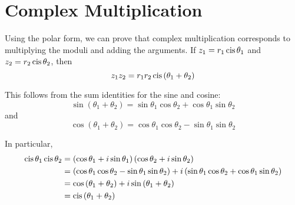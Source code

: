 \documentclass[handout]{ximera}
\begin{document}
\begin{image}
\end{image}


\section{Complex Multiplication}

Using the polar form, we can prove that complex multiplication corresponds to
multiplying the moduli and adding the arguments.
If $z_1 = r_1 \operatorname{cis} \theta_1$ and $z_2 = r_2 \operatorname{cis} \theta_2$, then
\[
 z_1 z_2 = r_1 r_2\operatorname{cis} \left(\theta_1+\theta_2\right) 
 \]

This follows from the sum identities for the sine and cosine:
\[
\sin\left(\theta_1+\theta_2\right) = \sin\theta_1 \cos \theta_2 +  \cos \theta_1 \sin \theta_2
\]
and
\[
\cos\left(\theta_1+\theta_2\right) = \cos\theta_1 \cos \theta_2 -  \sin \theta_1 \sin \theta_2
\]

In particular,
\begin{align*}
\operatorname{cis} \theta_1 \operatorname{cis} \theta_2 & = \left( \cos\theta_1 +i\sin \theta_1 \right)  \left( \cos \theta_2 + i  \sin \theta_2 \right)\\
  &=  \left(\cos\theta_1 \cos \theta_2  - \sin\theta_1 \sin \theta_2\right)+i \left(\sin \theta_1\cos \theta_2 + \cos \theta_1 \sin \theta_2 \right)\\
 &= \cos\left(\theta_1+\theta_2\right) + i \sin \left(\theta_1+\theta_2\right) \\
 &= \operatorname{cis} \left(\theta_1+\theta_2\right) 
\end{align*}
\end{document}

